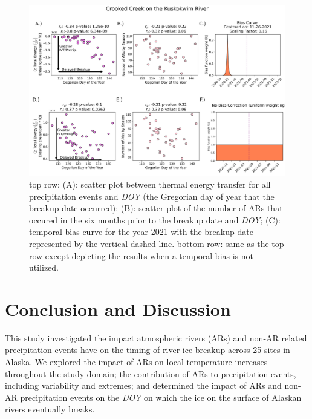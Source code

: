 \documentclass[12pts,draft]{AR_analysis_}
\begin{document}
\begin{figure}[H]
\centering
\includegraphics[width=1.0\textwidth]{./images/concatenated_scatter_bias_plots.png}
	\caption{top row: (A): scatter plot between thermal energy
	transfer for all precipitation events and \emph{DOY} (the Gregorian day 
	of year
	that the breakup date occurred); (B): scatter plot of the number of ARs
	that occured in the six months prior to the breakup date and
	\emph{DOY}; 
	(C): temporal bias curve for the year 2021 with the breakup
	date represented by the vertical dashed line. bottom row: same as
	the top row except depicting the results when a temporal bias
	is not utilized.}
\label{fig:concatenated_corr_plots}
\end{figure}



\section{Conclusion and Discussion}

This study investigated the impact atmospheric rivers (ARs) and 
non-AR related precipitation events have on the timing of river 
ice breakup across 25 sites in Alaska. 
We explored the impact of ARs on local temperature increases throughout 
the study domain; the contribution of ARs to precipitation events, 
including variability and extremes; and determined the impact of ARs and 
non-AR precipitation events on the \emph{DOY} 
on which the ice on the surface of Alaskan rivers eventually breaks. 
\end{document}
